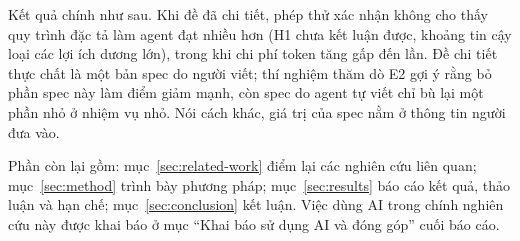 Kết quả chính như sau. Khi đề đã chi tiết, phép thử xác nhận không cho thấy quy trình đặc tả làm agent đạt
nhiều hơn (H1 chưa kết luận được, khoảng tin cậy loại các lợi ích dương lớn), trong khi chi phí token tăng gấp
\NumResTokenRatioMin{} đến \NumResTokenRatioMax{} lần. Đề chi tiết thực chất là một bản spec do người viết;
thí nghiệm thăm dò E2 gợi ý rằng bỏ phần spec này làm điểm giảm mạnh, còn spec do agent tự viết chỉ bù lại một
phần nhỏ ở nhiệm vụ nhỏ. Nói cách khác, giá trị của spec nằm ở thông tin người đưa vào.

Phần còn lại gồm: mục~\ref{sec:related-work} điểm lại các nghiên cứu liên quan; mục~\ref{sec:method}
trình bày phương pháp; mục~\ref{sec:results} báo cáo kết quả, thảo luận và hạn chế; mục~\ref{sec:conclusion}
kết luận. Việc dùng AI trong chính nghiên cứu này được khai báo ở mục
``Khai báo sử dụng AI và đóng góp'' cuối báo cáo.
